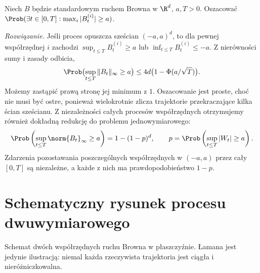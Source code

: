 \begin{zadanie}
Niech $B$ będzie standardowym ruchem Browna w $\R^d$, $a,T>0$.
Oszacować $\Prob(\exists t\in[0,T]:\max_i|B_t^{(i)}|\ge a)$.

\emph{Rozwiązanie.} Jeśli proces opuszcza sześcian $(-a,a)^d$,
to dla pewnej współrzędnej $i$ zachodzi
$\sup_{t\le T} B_t^{(i)}\ge a$ lub
$\inf_{t\le T} B_t^{(i)}\le-a$.
Z nierówności sumy i zasady odbicia,
\[
\Prob\bigl(\sup_{t\le T}\|B_t\|_\infty\ge a\bigr)
\le4d\bigl(1-\Phi(a/\sqrt T)\bigr).
\]
Możemy zastąpić prawą stronę jej minimum z $1$.
Oszacowanie jest proste, choć nie musi być ostre,
ponieważ wielokrotnie zlicza trajektorie przekraczające
kilka ścian sześcianu. Z niezależności całych procesów
współrzędnych otrzymujemy również dokładną redukcję
do problemu jednowymiarowego:
\[
\Prob\left(\sup_{t\le T}\norm{B_t}_\infty\ge a\right)
=1-(1-p)^d,\qquad
p=\Prob\left(\sup_{t\le T}|W_t|\ge a\right).
\]
Zdarzenia pozostawania poszczególnych współrzędnych
w $(-a,a)$ przez cały $[0,T]$ są niezależne,
a każde z nich ma prawdopodobieństwo $1-p$.
\end{zadanie}

\section{Schematyczny rysunek procesu dwuwymiarowego}
\begin{center}
\par\smallskip\small Schemat dwóch współrzędnych ruchu Browna w płaszczyźnie.
Łamana jest jedynie ilustracją: niemal każda rzeczywista trajektoria
jest ciągła i nieróżniczkowalna.
\end{center}


